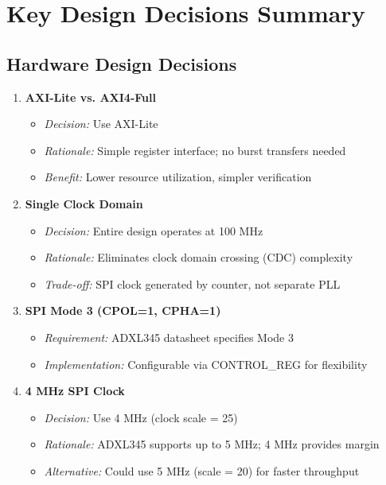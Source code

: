 \documentclass[11pt,a4paper]{article}
\begin{document}
\section{Key Design Decisions Summary}

\subsection{Hardware Design Decisions}

\begin{enumerate}
    \item \textbf{AXI-Lite vs. AXI4-Full}
    \begin{itemize}
        \item \textit{Decision:} Use AXI-Lite
        \item \textit{Rationale:} Simple register interface; no burst transfers needed
        \item \textit{Benefit:} Lower resource utilization, simpler verification
    \end{itemize}

    \item \textbf{Single Clock Domain}
    \begin{itemize}
        \item \textit{Decision:} Entire design operates at 100 MHz
        \item \textit{Rationale:} Eliminates clock domain crossing (CDC) complexity
        \item \textit{Trade-off:} SPI clock generated by counter, not separate PLL
    \end{itemize}

    \item \textbf{SPI Mode 3 (CPOL=1, CPHA=1)}
    \begin{itemize}
        \item \textit{Requirement:} ADXL345 datasheet specifies Mode 3
        \item \textit{Implementation:} Configurable via CONTROL\_REG for flexibility
    \end{itemize}

    \item \textbf{4 MHz SPI Clock}
    \begin{itemize}
        \item \textit{Decision:} Use 4 MHz (clock scale = 25)
        \item \textit{Rationale:} ADXL345 supports up to 5 MHz; 4 MHz provides margin
        \item \textit{Alternative:} Could use 5 MHz (scale = 20) for faster throughput
    \end{itemize}


\end{enumerate}
\end{document}
